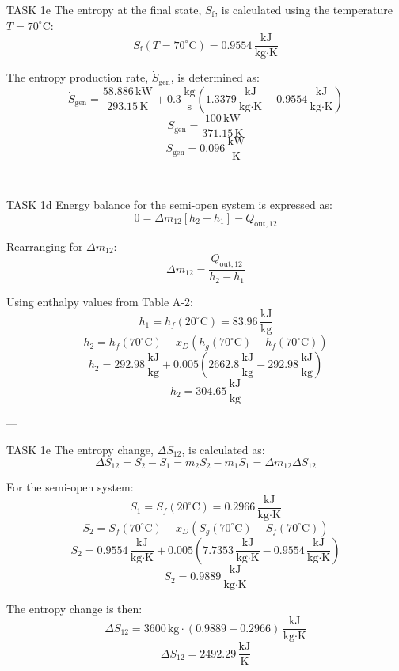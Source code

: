 TASK 1e  
The entropy at the final state, \( S_{\text{f}} \), is calculated using the temperature \( T = 70^\circ\text{C} \):  
\[
S_{\text{f}}(T = 70^\circ\text{C}) = 0.9554 \, \frac{\text{kJ}}{\text{kg·K}}
\]

The entropy production rate, \( \dot{S}_{\text{gen}} \), is determined as:  
\[
\dot{S}_{\text{gen}} = \frac{58.886 \, \text{kW}}{293.15 \, \text{K}} + 0.3 \, \frac{\text{kg}}{\text{s}} \left( 1.3379 \, \frac{\text{kJ}}{\text{kg·K}} - 0.9554 \, \frac{\text{kJ}}{\text{kg·K}} \right)
\]  
\[
\dot{S}_{\text{gen}} = \frac{100 \, \text{kW}}{371.15 \, \text{K}}
\]  
\[
\dot{S}_{\text{gen}} = 0.096 \, \frac{\text{kW}}{\text{K}}
\]

---

TASK 1d  
Energy balance for the semi-open system is expressed as:  
\[
0 = \Delta m_{12} \left[ h_2 - h_1 \right] - Q_{\text{out},12}
\]

Rearranging for \( \Delta m_{12} \):  
\[
\Delta m_{12} = \frac{Q_{\text{out},12}}{h_2 - h_1}
\]

Using enthalpy values from Table A-2:  
\[
h_1 = h_f(20^\circ\text{C}) = 83.96 \, \frac{\text{kJ}}{\text{kg}}
\]  
\[
h_2 = h_f(70^\circ\text{C}) + x_D \left( h_g(70^\circ\text{C}) - h_f(70^\circ\text{C}) \right)
\]  
\[
h_2 = 292.98 \, \frac{\text{kJ}}{\text{kg}} + 0.005 \left( 2662.8 \, \frac{\text{kJ}}{\text{kg}} - 292.98 \, \frac{\text{kJ}}{\text{kg}} \right)
\]  
\[
h_2 = 304.65 \, \frac{\text{kJ}}{\text{kg}}
\]

---

TASK 1e  
The entropy change, \( \Delta S_{12} \), is calculated as:  
\[
\Delta S_{12} = S_2 - S_1 = m_2 S_2 - m_1 S_1 = \Delta m_{12} \Delta S_{12}
\]

For the semi-open system:  
\[
S_1 = S_f(20^\circ\text{C}) = 0.2966 \, \frac{\text{kJ}}{\text{kg·K}}
\]  
\[
S_2 = S_f(70^\circ\text{C}) + x_D \left( S_g(70^\circ\text{C}) - S_f(70^\circ\text{C}) \right)
\]  
\[
S_2 = 0.9554 \, \frac{\text{kJ}}{\text{kg·K}} + 0.005 \left( 7.7353 \, \frac{\text{kJ}}{\text{kg·K}} - 0.9554 \, \frac{\text{kJ}}{\text{kg·K}} \right)
\]  
\[
S_2 = 0.9889 \, \frac{\text{kJ}}{\text{kg·K}}
\]

The entropy change is then:  
\[
\Delta S_{12} = 3600 \, \text{kg} \cdot (0.9889 - 0.2966) \, \frac{\text{kJ}}{\text{kg·K}}
\]  
\[
\Delta S_{12} = 2492.29 \, \frac{\text{kJ}}{\text{K}}
\]